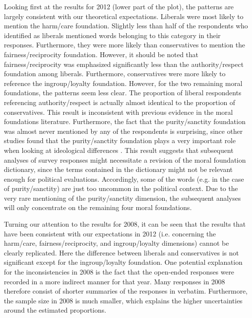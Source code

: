 \documentclass[12pt]{article}
\begin{document}
Looking first at the results for 2012 (lower part of the plot), the patterns are largely consistent with our theoretical expectations. Liberals were most likely to mention the harm/care foundation. Slightly less than half of the respondents who identified as liberals mentioned words belonging to this category in their responses. Furthermore, they were more likely than conservatives to mention the fairness/reciprocity foundation. However, it should be noted that fairness/reciprocity was emphasized significantly less than the authority/respect foundation among liberals. Furthermore, conservatives were more likely to reference the ingroup/loyalty foundation. However, for the two remaining moral foundations, the patterns seem less clear. The proportion of liberal respondents referencing authority/respect is actually almost identical to the proportion of conservatives. This result is inconsistent with previous evidence in the moral foundations literature. Furthermore, the fact that the purity/sanctity foundation was almost never mentioned by any of the respondents is surprising, since other studies found that the purity/sanctity foundation plays a very important role when looking at ideological differences \citep{koleva2012tracing}. This result suggests that subsequent analyses of survey responses might necessitate a revision of the moral foundation dictionary, since the terms contained in the dictionary might not be relevant enough for political evaluations. Accordingly, some of the words (e.g. in the case of purity/sanctity) are just too uncommon in the political context. Due to the very rare mentioning of the purity/sanctity dimension, the subsequent analyses will only concentrate on the remaining four moral foundations.

Turning our attention to the results for 2008, it can be seen that the results that have been consistent with our expectations in 2012 (i.e. concerning the harm/care, fairness/reciprocity, and ingroup/loyalty dimensions) cannot be clearly replicated. Here the difference between liberals and conservatives is not significant except for the ingroup/loyalty foundation. One potential explanation for the inconsistencies in 2008 is the fact that the open-ended responses were recorded in a more indirect manner for that year. Many responses in 2008 therefore consist of shorter summaries of the responses in verbatim. Furthermore, the sample size in 2008 is much smaller, which explains the higher uncertainties around the estimated proportions.
\end{document}
